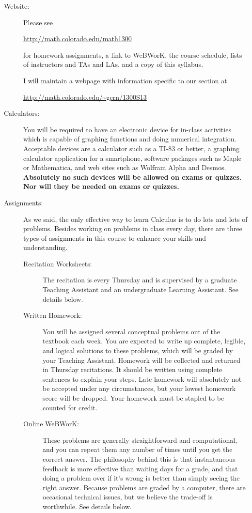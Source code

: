 \documentclass[11pt]{article}
\begin{document}
\begin{description}
  
\item[Website:] Please see
  \begin{center}
    \url{http://math.colorado.edu/math1300}
  \end{center}
  for homework assignments, a link to WeBWorK, the course schedule,
  lists of instructors and TAs and LAs, and a copy of this syllabus.

  I will maintain a webpage with information specific to our section
  at
  \begin{center}
    \url{http://math.colorado.edu/~gern/1300S13}
  \end{center}

\item[Calculators:] You will be required to have an electronic device
  for in-class activities which is capable of graphing functions and
  doing numerical integration. Acceptable devices are a calculator
  such as a TI-83 or better, a graphing calculator application for a
  smartphone, software packages such as Maple or Mathematica, and web
  sites such as Wolfram Alpha and Desmos.  \textbf{Absolutely no such
    devices will be allowed on exams or quizzes. Nor will they be
    needed on exams or quizzes.}

\item[Assignments:] As we said, the only effective way to learn
  Calculus is to do lots and lots of problems.  Besides working on
  problems in class every day, there are three types of assignments in
  this course to enhance your skills and understanding.

  \begin{description}
  \item[Recitation Worksheets:] The recitation is every Thursday and is
    supervised by a graduate Teaching Assistant and an undergraduate
    Learning Assistant.  See details below.
  \item[Written Homework:] You will be assigned several conceptual
    problems out of the textbook each week. You are expected to write
    up complete, legible, and logical solutions to these problems,
    which will be graded by your Teaching Assistant. Homework will be
    collected and returned in Thursday recitations. It should be
    written using complete sentences to explain your steps. Late
    homework will absolutely not be accepted under any circumstances,
    but your lowest homework score will be dropped.  Your homework
    must be stapled to be counted for credit.
  \item[Online WeBWorK:] These problems are generally straightforward
    and computational, and you can repeat them any number of times
    until you get the correct answer. The philosophy behind this is
    that instantaneous feedback is more effective than waiting days
    for a grade, and that doing a problem over if it's wrong is better
    than simply seeing the right answer. Because problems are graded
    by a computer, there are occasional technical issues, but we
    believe the trade-off is worthwhile. See details below.
  \end{description}


\end{description}
\end{document}
